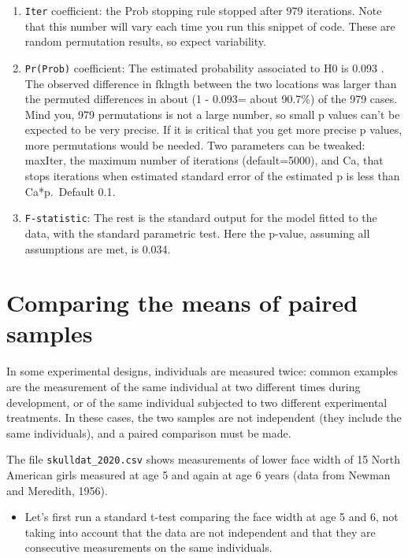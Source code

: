 \documentclass[
  12pt,
]{book}
\providecommand{\tightlist}{%
  \setlength{\itemsep}{0pt}\setlength{\parskip}{0pt}}
\begin{document}
\begin{enumerate}
\def\labelenumi{\arabic{enumi}.}
\tightlist
\item
  \texttt{Iter} coefficient: the Prob stopping rule stopped after 979 iterations. Note that this number will vary each time you run this snippet of code. These are random permutation results, so expect variability.
\item
  \texttt{Pr(Prob)} coefficient: The estimated probability associated to H0 is 0.093 . The observed difference in fklngth between the two locations was larger than the permuted differences in about (1 - 0.093= about 90.7\%) of the 979 cases. Mind you, 979 permutations is not a large number, so small p values can't be expected to be very precise. If it is critical that you get more precise p values, more permutations would be needed. Two parameters can be tweaked: maxIter, the maximum number of iterations (default=5000), and Ca, that stops iterations when estimated standard error of the estimated p is less than Ca*p.~Default 0.1.
\item
  \texttt{F-statistic}: The rest is the standard output for the model fitted to the data, with the standard parametric test. Here the p-value, assuming all assumptions are met, is 0.034.
\end{enumerate}

\hypertarget{comparing-the-means-of-paired-samples}{%
\section{Comparing the means of paired samples}\label{comparing-the-means-of-paired-samples}}

In some experimental designs, individuals are measured twice: common examples are the measurement of the same individual at two different times during development, or of the same individual subjected to two different experimental treatments. In these cases, the two samples are not independent (they include the same individuals), and a paired comparison must be made.

The file \texttt{skulldat\_2020.csv} shows measurements of lower face width of 15 North American girls measured at age 5 and again at age 6 years (data from Newman and Meredith, 1956).

\begin{itemize}
\tightlist
\item
  Let's first run a standard t-test comparing the face width at age 5 and 6, not taking into account that the data are not independent and that they are consecutive measurements on the same individuals.
\end{itemize}
\end{document}
